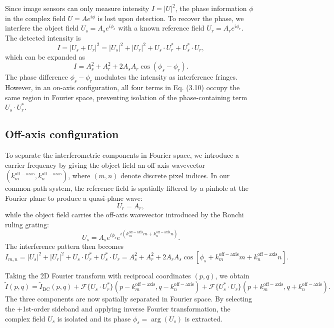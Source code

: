 Since image sensors can only measure intensity $I = |U|^2$, the phase information $\phi$ in the complex field $U = A e^{i\phi}$ is lost upon detection. To recover the phase, we interfere the object field $U_s = A_s e^{i\phi_s}$ with a known reference field $U_r = A_r e^{i\phi_r}$. The detected intensity is
\begin{equation}
I = |U_s + U_r|^2 = |U_s|^2 + |U_r|^2 + U_s \cdot U_r^* + U_s^* \cdot U_r,
\end{equation}
which can be expanded as
\begin{equation}
I = A_s^2 + A_r^2 + 2A_s A_r \cos(\phi_s - \phi_r).
\end{equation}
The phase difference $\phi_s - \phi_r$ modulates the intensity as interference fringes. However, in an on-axis configuration, all four terms in Eq. (3.10) occupy the same region in Fourier space, preventing isolation of the phase-containing term $U_s \cdot U_r^*$.

\subsection{Off-axis configuration}

To separate the interferometric components in Fourier space, we introduce a carrier frequency by giving the object field an off-axis wavevector $(k_m^{\mathrm{off-axis}}, k_n^{\mathrm{off-axis}})$, where $(m, n)$ denote discrete pixel indices. In our common-path system, the reference field is spatially filtered by a pinhole at the Fourier plane to produce a quasi-plane wave:
\begin{equation}
U_r = A_r,
\end{equation}
while the object field carries the off-axis wavevector introduced by the Ronchi ruling grating:
\begin{equation}
U_s = A_s e^{i\phi_s} e^{i(k_m^{\mathrm{off-axis}} m + k_n^{\mathrm{off-axis}} n)}.
\end{equation}
The interference pattern then becomes
\begin{equation}
I_{m,n} = |U_s|^2 + |U_r|^2 + U_s \cdot U_r^* + U_s^* \cdot U_r = A_s^2 + A_r^2 + 2A_r A_s \cos[\phi_s + k_m^{\mathrm{off-axis}} m + k_n^{\mathrm{off-axis}} n].
\end{equation}

Taking the 2D Fourier transform with reciprocal coordinates $(p,q)$, we obtain
\begin{equation}
\tilde{I}(p,q) = \tilde{I}_{\mathrm{DC}}(p,q) + \mathcal{F}\{U_s \cdot U_r^*\}(p - k_m^{\mathrm{off-axis}}, q - k_n^{\mathrm{off-axis}}) + \mathcal{F}\{U_s^* \cdot U_r\}(p + k_m^{\mathrm{off-axis}}, q + k_n^{\mathrm{off-axis}}).
\end{equation}
The three components are now spatially separated in Fourier space. By selecting the +1st-order sideband and applying inverse Fourier transformation, the complex field $U_s$ is isolated and its phase $\phi_s = \arg(U_s)$ is extracted.

